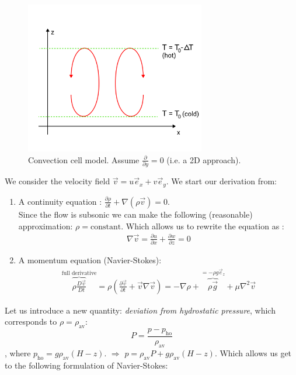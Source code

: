 \begin{figure}[h!]
    \centering
    \includegraphics[width=0.7\textwidth]{figures/1_convection_cell.png}
    \caption{Convection cell model. Assume $\frac{\partial}{\partial y} = 0$ (i.e. a 2D approach).}
\end{figure}

We consider the velocity field $\vec{v} = u \vec{e}_x + v \vec{e}_y$. We start our derivation from:

\begin{enumerate}
    \item A continuity equation : $\frac{\partial \rho}{\partial t} + \nabla (\rho \vec{v}) = 0$. \\
    Since the flow is subsonic we can make the following (reasonable) approximation: $\rho = \text{constant}$. Which allows us to rewrite the equation as : 
    \begin{align}
        \nabla \vec{v} = \frac{\partial u}{ \partial x} + \frac{\partial w}{ \partial z} = 0  \tag{1}
    \end{align}
    \item A momentum equation (Navier-Stokes):\\
    \begin{align*}
        \overbrace{\rho \frac{D \vec{v}}{D t}}^\text{full derivative} 
        = \rho \left( 
            \frac{\partial \vec{v}}{\partial t} + \vec{v} \nabla \vec{v} \right) 
        = - \nabla \rho + \overbrace{\rho \vec{g}}^{= - \rho g \vec{e}_z} + \mu \nabla^2 \vec{v} 
    \end{align*}
\end{enumerate}

Let us introduce a new quantity: \textit{deviation from hydrostatic pressure}, which corresponds to $\rho = \rho_\text{av}$:
 \[P = \frac{p - p_\text{ho}}{\rho_\text{av}}\]
, where $p_\text{ho}  = g \rho_\text{av} (H-z)$. $\Rightarrow$ $p = \rho_\text{av}P + g \rho_\text{av}(H-z)$. Which allows us get to the following formulation of Navier-Stokes: 

